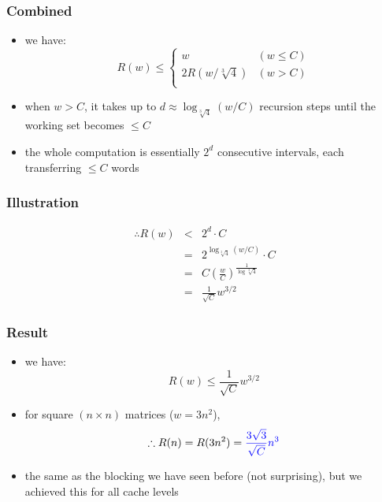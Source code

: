 \documentclass[12pt,dvipdfmx]{beamer}
\newcommand{\ao}[1]{{\color{blue}#1}}
\begin{document}
\begin{frame}
\frametitle{Combined}
\begin{itemize}
\item we have:
\begin{equation*}
R(w) \leq \left\{
\begin{array}{ll}
w                   & (w \leq C) \\
2R(w / \sqrt[3]{4}) & (w > C) \\
\end{array}
\right.  
\end{equation*}

\item when $w > C$, it takes up to 
$d \approx \log_{\sqrt[3]{4}}(w/C)$
recursion steps until the working set becomes $\leq C$

\item the whole computation is essentially $2^d$
  consecutive intervals, each transferring $\leq C$ words
\end{itemize}
\end{frame}

\begin{frame}
\frametitle{Illustration}
\begin{center}
\def\svgwidth{0.9\textwidth}
{\tiny}
\end{center}

\begin{eqnarray*}
\therefore R(w) & < & 2^d \cdot C  \\
                & =  & 2^{\log_{\sqrt[3]{4}}(w/C)} \cdot C \\
                & =  & C \left(\frac{w}{C}\right)^{\frac{1}{\log\sqrt[3]{4}}} \\
                & = & \frac{1}{\sqrt{C}} w^{3/2}
\end{eqnarray*}
              
\end{frame}


\begin{frame}
\frametitle{Result}
\begin{itemize}
\item we have:
\begin{equation*}
R(w) \leq \frac{1}{\sqrt{C}} w^{3/2}
\end{equation*}

\item for square $(n \times n)$ matrices ($w = 3n^2$),
\begin{equation*}
\therefore R(n) = R(3n^2) = \ao{\frac{3\sqrt{3}}{\sqrt{C}} n^3}
\end{equation*}

\item the same as the blocking we have seen before (not surprising), but
  we achieved this for all cache levels
  \end{itemize}
\end{frame}
\end{document}
